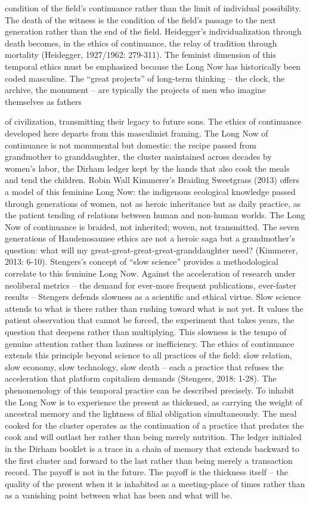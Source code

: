 condition of the field’s continuance rather than the limit of individual possibility. The death of the witness is the condition of the field’s passage to the next generation rather than the end of the field. Heidegger’s individualization through death becomes, in the ethics of continuance, the relay of tradition through mortality (Heidegger, 1927/1962: 279-311). The feminist dimension of this temporal ethics must be emphasized because the Long Now has historically been coded masculine. The “great projects” of long-term thinking – the clock, the archive, the monument – are typically the projects of men who imagine themselves as fathers

of civilization, transmitting their legacy to future sons. The ethics of continuance developed here departs from this masculinist framing. The Long Now of continuance is not monumental but domestic: the recipe passed from grandmother to granddaughter, the cluster maintained across decades by women’s labor, the Dirham ledger kept by the hands that also cook the meals and tend the children. Robin Wall Kimmerer’s Braiding Sweetgrass (2013) offers a model of this feminine Long Now: the indigenous ecological knowledge passed through generations of women, not as heroic inheritance but as daily practice, as the patient tending of relations between human and non-human worlds. The Long Now of continuance is braided, not inherited; woven, not transmitted. The seven generations of Haudenosaunee ethics are not a heroic saga but a grandmother’s question: what will my great-great-great-great-granddaughter need? (Kimmerer, 2013: 6-10). Stengers’s concept of “slow science” provides a methodological correlate to this feminine Long Now. Against the acceleration of research under neoliberal metrics – the demand for ever-more frequent publications, ever-faster results – Stengers defends slowness as a scientific and ethical virtue. Slow science attends to what is there rather than rushing toward what is not yet. It values the patient observation that cannot be forced, the experiment that takes years, the question that deepens rather than multiplying. This slowness is the tempo of genuine attention rather than laziness or inefficiency. The ethics of continuance extends this principle beyond science to all practices of the field: slow relation, slow economy, slow technology, slow death – each a practice that refuses the acceleration that platform capitalism demands (Stengers, 2018: 1-28). The phenomenology of this temporal practice can be described precisely. To inhabit the Long Now is to experience the present as thickened, as carrying the weight of ancestral memory and the lightness of filial obligation simultaneously. The meal cooked for the cluster operates as the continuation of a practice that predates the cook and will outlast her rather than being merely nutrition. The ledger initialed in the Dirham booklet is a trace in a chain of memory that extends backward to the first cluster and forward to the last rather than being merely a transaction record. The payoff is not in the future. The payoff is the thickness itself – the quality of the present when it is inhabited as a meeting-place of times rather than as a vanishing point between what has been and what will be.

